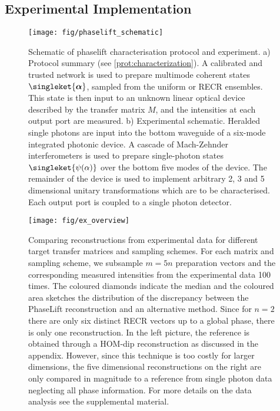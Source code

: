 \subsection{Experimental Implementation}

\begin{figure}[tbp]
  \centering
  \texttt{[image: fig/phaselift\_schematic]}%
  \caption{%
    Schematic of phaselift characterisation protocol and experiment.
     a) Protocol summary (see \cref{prot:characterization}).
     A calibrated and trusted network is used to prepare multimode coherent states $\singleket{\boldsymbol{\alpha}}$, sampled from the uniform or RECR ensembles.
     This state is then input to an unknown linear optical device described by the transfer matrix $ M$, and the intensities at each output port are measured.
     b) Experimental schematic.
     Heralded single photons are input into the bottom waveguide of a six-mode integrated photonic device.
     A cascade of Mach-Zehnder interferometers is used to prepare single-photon states $\singleket{\psi( \alpha)}$ over the bottom five modes of the device.
     The remainder of the device is used to implement arbitrary 2, 3 and 5 dimensional unitary transformations which are to be characterised.
     Each output port is coupled to a single photon detector.
   }
  \label{fig:experimental.schematic}
\end{figure}


\begin{figure*}[tbp]
  \centering
  \texttt{[image: fig/ex\_overview]}
  \caption{%
     \label{fig:experimental.overview}
     Comparing reconstructions from experimental data for different target transfer matrices and sampling schemes.
     For each matrix and sampling scheme, we subsample $m = 5n$ preparation vectors and the corresponding measured intensities from the experimental data 100 times.
     The coloured diamonds indicate the median and the coloured area sketches the distribution of the discrepancy between the PhaseLift reconstruction and an alternative method.
     Since for $n=2$ there are only six distinct RECR vectors up to a global phase, there is only one reconstruction.
     In the left picture, the reference is obtained through a HOM-dip reconstruction as discussed in the appendix.
     However, since this technique is too costly for larger dimensions, the five dimensional reconstructions on the right are only compared in magnitude to a reference from single photon data neglecting all phase information.
     For more details on the data analysis see the supplemental material.
  }
\end{figure*}

